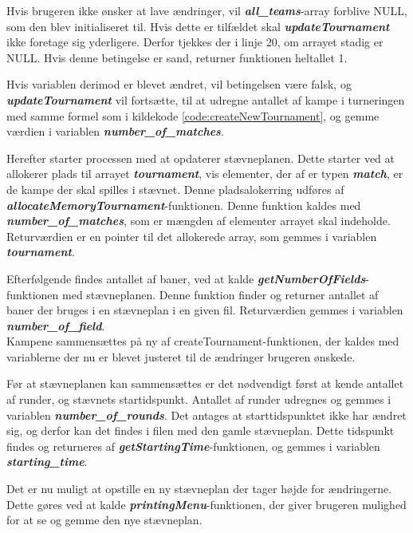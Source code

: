 \par
Hvis brugeren ikke ønsker at lave ændringer, vil \textbf{\textit{all\_teams}}-array forblive NULL, som den blev initialiseret til. Hvis dette er tilfældet skal \textbf{\textit{updateTournament}} ikke foretage sig yderligere. Derfor tjekkes der i linje 20, om arrayet stadig er NULL. Hvis denne betingelse er sand, returner funktionen heltallet 1.
\par
Hvis variablen derimod er blevet ændret, vil betingelsen være falsk, og \textbf{\textit{updateTournament}} vil fortsætte, til at udregne antallet af kampe i turneringen med samme formel som i kildekode \ref{code:createNewTournament}, og gemme værdien i variablen \textbf{\textit{number\_of\_matches}}.
\par
Herefter starter processen med at opdaterer stævneplanen. Dette starter ved at allokerer plads til arrayet \textbf{\textit{tournament}}, vis elementer, der af er typen \textbf{\textit{match}}, er de kampe der skal spilles i stævnet.
Denne pladsalokerring udføres af \textbf{\textit{allocateMemoryTournament}}-funktionen. Denne funktion kaldes med \textbf{\textit{number\_of\_matches}}, som er mængden af elementer arrayet skal indeholde. Returværdien er en pointer til det allokerede array, som gemmes i variablen \textbf{\textit{tournament}}.
\par
Efterfølgende findes antallet af baner, ved at kalde \textbf{\textit{getNumberOfFields}}-funktionen med stævneplanen. Denne funktion finder og returner antallet af baner der bruges i en stævneplan i en given fil. Returværdien gemmes i variablen \textbf{\textit{number\_of\_field}}.\\
Kampene sammensættes på ny af createTournament-funktionen, der kaldes med variablerne der nu er blevet justeret til de ændringer brugeren ønskede.
\par
Før at stævneplanen kan sammensættes er det nødvendigt først at kende antallet af runder, og stævnets startidspunkt. Antallet af runder udregnes og gemmes i variablen \textbf{\textit{number\_of\_rounds}}. Det antages at starttidspunktet ikke har ændret sig, og derfor kan det findes i filen med den gamle stævneplan. Dette tidspunkt findes og returneres af \textbf{\textit{getStartingTime}}-funktionen, og gemmes i variablen \textbf{\textit{starting\_time}}.
\par
Det er nu muligt at opstille en ny stævneplan der tager højde for ændringerne. Dette gøres ved at kalde \textbf{\textit{printingMenu}}-funktionen, der giver brugeren mulighed for at se og gemme den nye stævneplan.

